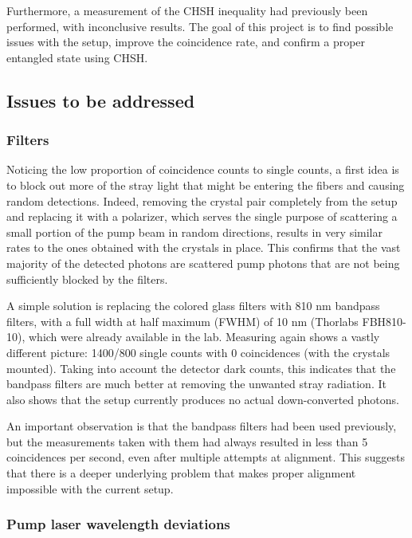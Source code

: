 \documentclass[a4paper,
DIV=13,
12pt,
BCOR=10mm,
department=FakEI,
twoside,
parskip=half,
automark,
logostyle=flat,
]{OTHRartcl}
\begin{document}
Furthermore, a measurement of the CHSH inequality had previously been performed, with inconclusive results. The goal of this project is to find possible issues with the setup, improve the coincidence rate, and confirm a proper entangled state using CHSH.


\subsection{Issues to be addressed}

\subsubsection{Filters}

Noticing the low proportion of coincidence counts to single counts, a first idea is to block out more of the stray light that might be entering the fibers and causing random detections. Indeed, removing the crystal pair completely from the setup and replacing it with a polarizer, which serves the single purpose of scattering a small portion of the pump beam in random directions, results in very similar rates to the ones obtained with the crystals in place. This confirms that the vast majority of the detected photons are scattered pump photons that are not being sufficiently blocked by the filters.

A simple solution is replacing the colored glass filters with 810 nm bandpass filters, with a full width at half maximum (FWHM) of 10 nm (Thorlabs FBH810-10), which were already available in the lab. Measuring again shows a vastly different picture: 1400/800 single counts with 0 coincidences (with the crystals mounted). Taking into account the detector dark counts, this indicates that the bandpass filters are much better at removing the unwanted stray radiation. It also shows that the setup currently produces no actual down-converted photons.

An important observation is that the bandpass filters had been used previously, but the measurements taken with them had always resulted in less than 5 coincidences per second, even after multiple attempts at alignment. This suggests that there is a deeper underlying problem that makes proper alignment impossible with the current setup.


\subsubsection{Pump laser wavelength deviations}
\end{document}
